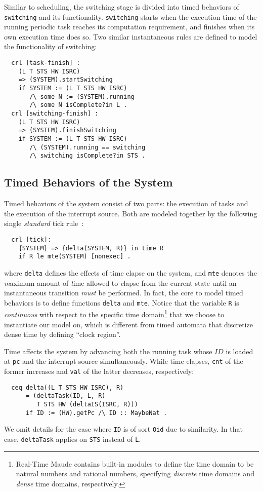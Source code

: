 \documentclass[10pt,journal]{IEEEtran}
\begin{document}
Similar to scheduling, the switching stage is divided into timed
behaviors of \verb|switching| and its functionality. \verb|switching|
starts when the execution time of the running periodic task reaches
its computation requirement, and finishes when its own execution time
does so. Two similar instantaneous rules are defined to model the
functionality of switching:
\begin{verbatim}
  crl [task-finish] :
    (L T STS HW ISRC) 
    => (SYSTEM).startSwitching
    if SYSTEM := (L T STS HW ISRC)
       /\ some N := (SYSTEM).running
       /\ some N isComplete?in L .
  crl [switching-finish] :
    (L T STS HW ISRC) 
    => (SYSTEM).finishSwitching
    if SYSTEM := (L T STS HW ISRC)
       /\ (SYSTEM).running == switching
       /\ switching isComplete?in STS .
\end{verbatim}

\subsection{Timed Behaviors of the System}
\label{ss:timedbehavior}
Timed behaviors of the system consist of two parts: the execution of
tasks and the execution of the interrupt source. Both are modeled
together by the following single \emph{standard} tick
rule~\cite{DBLP:journals/entcs/OlveczkyM07a}:
\begin{verbatim}
  crl [tick]:
    {SYSTEM} => {delta(SYSTEM, R)} in time R 
    if R le mte(SYSTEM) [nonexec] .
\end{verbatim}
where \verb|delta| defines the effects of time elapse on the system,
and \verb|mte| denotes the \emph{m}aximum amount of \emph{t}ime
allowed to \emph{e}lapse from the current state until an instantaneous
transition \emph{must} be performed. In fact, the core to model timed
behaviors is to define functions \verb|delta| and \verb|mte|. Notice
that the variable \verb|R| is \emph{continuous} with respect to the
specific time domain\footnote{Real-Time Maude contains built-in
  modules to define the time domain to be natural numbers and rational
  numbers, specifying \emph{discrete} time domains and \emph{dense}
  time domains, respectively.}  that we choose to instantiate our
model on, which is different from timed automata that discretize dense
time by defining ``clock region''.

Time affects the system by advancing both the running task whose $ID$
is loaded at \verb|pc| and the interrupt source simultaneously.  While
time elapses, \verb|cnt| of the former increases and \verb|val| of the
latter decreases, respectively:
\begin{verbatim}
  ceq delta((L T STS HW ISRC), R)
      = (deltaTask(ID, L, R) 
         T STS HW (deltaIS(ISRC, R)))
      if ID := (HW).getPc /\ ID :: MaybeNat .
\end{verbatim}
We omit details for the case where \verb|ID| is of sort \verb|Oid| due
to similarity. In that case, \verb|deltaTask| applies on \verb|STS|
instead of \verb|L|.
\end{document}

